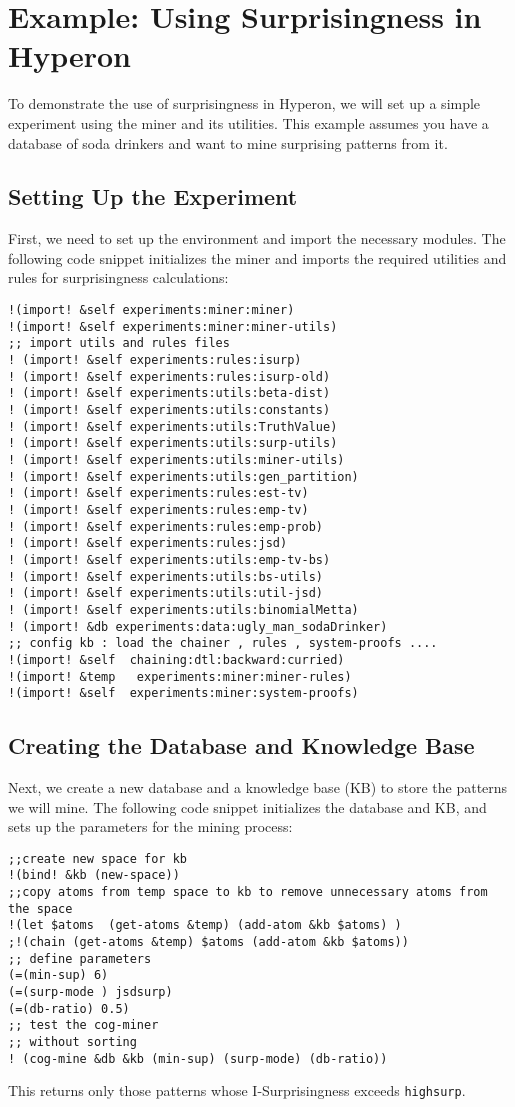 \documentclass{article}
\begin{document}
\section{Example: Using Surprisingness in Hyperon} 
To demonstrate the use of surprisingness in Hyperon, we will set up a simple experiment using the miner and its utilities. This example assumes you have a database of soda drinkers
and want to mine surprising patterns from it.
\subsection{Setting Up the Experiment}
First, we need to set up the environment and import the necessary modules. The following code snippet initializes the miner and imports the required utilities and rules for surprisingness calculations:

\begin{verbatim}
!(import! &self experiments:miner:miner)
!(import! &self experiments:miner:miner-utils)
;; import utils and rules files 
! (import! &self experiments:rules:isurp)
! (import! &self experiments:rules:isurp-old)
! (import! &self experiments:utils:beta-dist)
! (import! &self experiments:utils:constants)
! (import! &self experiments:utils:TruthValue)
! (import! &self experiments:utils:surp-utils)
! (import! &self experiments:utils:miner-utils)
! (import! &self experiments:utils:gen_partition)
! (import! &self experiments:rules:est-tv)
! (import! &self experiments:rules:emp-tv)
! (import! &self experiments:rules:emp-prob)
! (import! &self experiments:rules:jsd)
! (import! &self experiments:utils:emp-tv-bs)
! (import! &self experiments:utils:bs-utils)
! (import! &self experiments:utils:util-jsd)
! (import! &self experiments:utils:binomialMetta)
! (import! &db experiments:data:ugly_man_sodaDrinker)
;; config kb : load the chainer , rules , system-proofs ....
!(import! &self  chaining:dtl:backward:curried)
!(import! &temp   experiments:miner:miner-rules)
!(import! &self  experiments:miner:system-proofs)
\end{verbatim}


\subsection{Creating the Database and Knowledge Base}
Next, we create a new database and a knowledge base (KB) to store the patterns we will mine. The following code snippet initializes the database and KB, and sets up the parameters for the mining process:

\begin{verbatim}
;;create new space for kb
!(bind! &kb (new-space))
;;copy atoms from temp space to kb to remove unnecessary atoms from the space
!(let $atoms  (get-atoms &temp) (add-atom &kb $atoms) )
;!(chain (get-atoms &temp) $atoms (add-atom &kb $atoms))
;; define parameters 
(=(min-sup) 6)
(=(surp-mode ) jsdsurp)
(=(db-ratio) 0.5)
;; test the cog-miner
;; without sorting 
! (cog-mine &db &kb (min-sup) (surp-mode) (db-ratio))
\end{verbatim}





This returns only those patterns whose I-Surprisingness exceeds \texttt{highsurp}.
\end{document}

